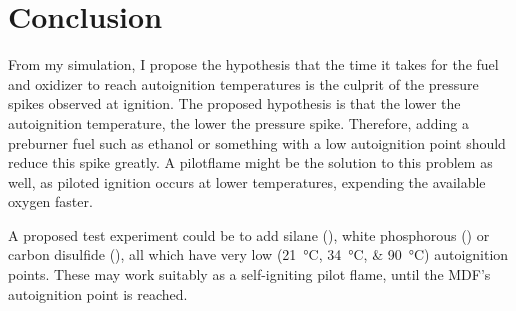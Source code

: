 \chapter{Conclusion}

From my simulation, I propose the hypothesis that the time it takes for the fuel and oxidizer to reach autoignition temperatures is the culprit of the pressure spikes observed at ignition. The proposed hypothesis is that the lower the autoignition temperature, the lower the pressure spike. Therefore, adding a preburner fuel such as ethanol or something with a low autoignition point should reduce this spike greatly. A pilotflame might be the solution to this problem as well, as piloted ignition occurs at lower temperatures, expending the available oxygen faster.

A proposed test experiment could be to add silane (), white phosphorous () or carbon disulfide (), all which have very low (\SIlist{21;34;90}{\celsius}) autoignition points. These may work suitably as a self-igniting pilot flame, until the MDF's autoignition point is reached.
